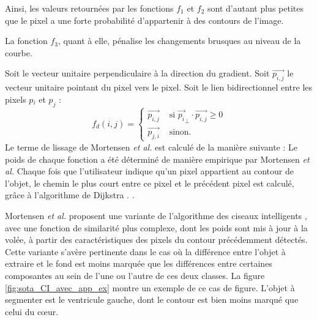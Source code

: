 Ainsi, les valeurs retournées par les fonctions $f_{1}$ et $f_{2}$ sont d'autant plus petites que le pixel a une forte probabilité d'appartenir à  des contours de l'image.

La fonction $f_{3}$, quant à elle, pénalise les changements brusques au niveau de la courbe.

Soit 
le vecteur unitaire perpendiculaire à la direction du gradient.   Soit $\overrightarrow{p_{i,j}}$ le vecteur unitaire pointant du  pixel vers le   pixel.
Soit le lien bidirectionnel entre les pixels $p{_i}$ et $p_{j}$ : 
\begin{equation}
f_{d}(i,j) =  \begin{cases}
 \overrightarrow{p_{i,j}} &\text{ si }  \overrightarrow{p_{i}}_{\perp} \cdot \overrightarrow{p_{i,j}} \geqslant 0\\
 \overrightarrow{p_{j,i}} &\text{ sinon. }
\end{cases}
\end{equation}
Le terme de lissage de Mortensen \textit{et al.} est calculé de la manière suivante :
Le poids de chaque fonction a été déterminé de manière empirique par Mortensen \textit{et al.} Chaque fois que l'utilisateur indique qu'un pixel appartient au contour de l'objet, le chemin le plus court entre ce pixel et le précédent pixel  est calculé, grâce à l'algorithme de Dijkstra \cite{Dijkstra59anote}. .

 Mortensen \textit{et al.} proposent une variante de l'algorithme des ciseaux intelligents \cite{mortensen1998interactive}, avec une fonction de similarité plus complexe, dont les poids sont mis à jour à la volée, à partir des caractéristiques des pixels du contour précédemment détectés. Cette variante s'avère pertinente dans le cas où la différence entre l'objet à extraire et le fond est moins marquée que les différences entre certaines composantes au sein de l'une ou l'autre de ces deux classes. La figure \ref{fig:sota_CI_avec_app_ex} montre un exemple de ce cas de figure. L'objet à segmenter est le ventricule gauche, dont le contour est bien moins marqué que celui du cœur. 
 
